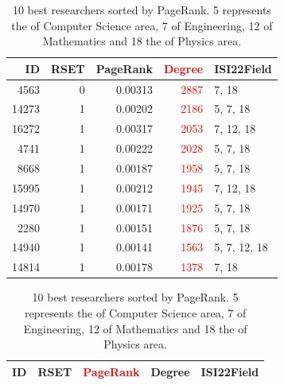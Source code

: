\documentclass{article}
\begin{document}
\begin{multicols}{2}
\begin{table}[ht]
\begin{minipage}[b]{0.5\linewidth}
       \begin{tabular}{r|rrrl}

\textbf{ID} & \textbf{RSET} & \textbf{PageRank} & \textbf{\textcolor{red}{Degree}} & \textbf{ISI22Field} \\
\hline

4563 & 0 & 0.00313 & \textcolor{red}{2887} & 7, 18 \\
14273 & 1 & 0.00202 & \textcolor{red}{2186} & 5, 7, 18 \\
16272 &	1 & 0.00317 & \textcolor{red}{2053} & 7, 12, 18 \\
4741 & 1 & 0.00222 & \textcolor{red}{2028} & 5, 7, 18 \\
8668 & 1 & 0.00187 & \textcolor{red}{1958} & 5, 7, 18 \\
15995 & 1 & 0.00212 & \textcolor{red}{1945} & 7, 12, 18 \\
14970 & 1 & 0.00171 & \textcolor{red}{1925} & 5, 7, 18 \\
2280 & 1 & 0.00151 & \textcolor{red}{1876} & 5, 7, 18 \\
14940 & 1 & 0.00141 & \textcolor{red}{1563} & 5, 7, 12, 18 \\
14814 & 1 & 0.00178 & \textcolor{red}{1378} & 7, 18 \\
\hline 
        \end{tabular}
    \end{minipage}
    \hspace{0.5cm}
    \begin{minipage}[b]{0.5\linewidth}
        \caption{10 best researchers sorted by PageRank. 5 represents the of Computer Science area, 7 of Engineering, 12 of Mathematics and 18 the of Physics area. \label{tab:table2}}
        \centering
        
        \begin{tabular}{r|rrrl}
\textbf{ID} & \textbf{RSET} & \textbf{\textcolor{red}{PageRank}} & \textbf{Degree} & \textbf{ISI22Field} \\
\hline


\end{tabular}
\end{minipage}
\end{table}
\end{multicols}
\end{document}
